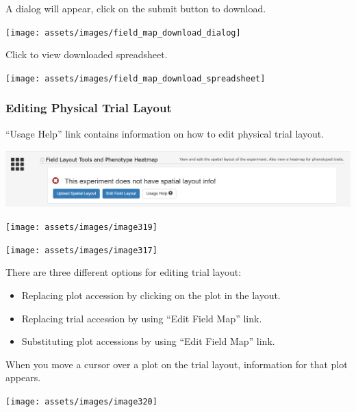 \documentclass[
  12pt,
]{book}
\begin{document}
A dialog will appear, click on the submit button to download.

\begin{center}\texttt{[image: assets/images/field\_map\_download\_dialog]} \end{center}

Click to view downloaded spreadsheet.

\begin{center}\texttt{[image: assets/images/field\_map\_download\_spreadsheet]} \end{center}

\hypertarget{editing-physical-trial-layout}{%
\subsubsection*{Editing Physical Trial Layout}\label{editing-physical-trial-layout}}


``Usage Help'' link contains information on how to edit physical trial layout.

\begin{center}\includegraphics[width=0.75\linewidth]{assets/images/image332} \end{center}

\begin{center}\texttt{[image: assets/images/image319]} \end{center}

\begin{center}\texttt{[image: assets/images/image317]} \end{center}

There are three different options for editing trial layout:

\begin{itemize}
\item
  Replacing plot accession by clicking on the plot in the layout.
\item
  Replacing trial accession by using ``Edit Field Map'' link.
\item
  Substituting plot accessions by using ``Edit Field Map'' link.
\end{itemize}

When you move a cursor over a plot on the trial layout, information for that plot appears.

\begin{center}\texttt{[image: assets/images/image320]} \end{center}
\end{document}
